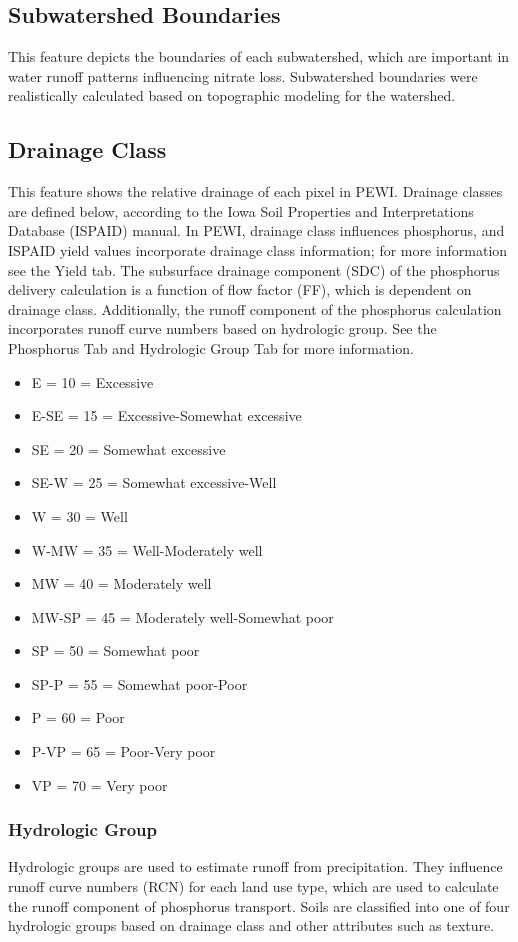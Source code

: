 \documentclass[11pt]{article}
\begin{document}
\subsection{Subwatershed Boundaries}
This feature depicts the boundaries of each subwatershed, which are important in water runoff patterns influencing nitrate loss. Subwatershed boundaries were realistically calculated based on topographic modeling for the watershed. 

\subsection{Drainage Class}
This feature shows the relative drainage of each pixel in PEWI. Drainage classes are defined below, according to the Iowa Soil Properties and Interpretations Database (ISPAID) manual.\cite{29}  In PEWI, drainage class influences phosphorus, and ISPAID yield values incorporate drainage class information; for more information see the Yield tab.\cite{30}  The subsurface drainage component (SDC) of the phosphorus delivery calculation is a function of flow factor (FF), which is dependent on drainage class. Additionally, the runoff component of the phosphorus calculation incorporates runoff curve numbers based on hydrologic group. See the Phosphorus Tab and Hydrologic Group Tab for more information. 
\begin{itemize}
\item E	=	10	=	Excessive
\item E-SE	=	15	=	Excessive-Somewhat excessive
\item SE	=	20	=	Somewhat excessive
\item SE-W	=	25	=	Somewhat excessive-Well
\item W	=	30	=	Well
\item W-MW	=	35	=	Well-Moderately well
\item MW	=	40	=	Moderately well
\item MW-SP	=	45	=	Moderately well-Somewhat poor 
\item SP	=	50	=	Somewhat poor
\item SP-P	=	55	=	Somewhat poor-Poor
\item P	=	60	=	Poor
\item P-VP	=	65	=	Poor-Very poor
\item VP	=	70	=	Very poor
\end{itemize}

\subsubsection{Hydrologic Group}
Hydrologic groups are used to estimate runoff from precipitation. They influence runoff curve numbers (RCN) for each land use type, which are used to calculate the runoff component of phosphorus transport. Soils are classified into one of four hydrologic groups based on drainage class and other attributes such as texture.\cite{31} 
\end{document}
